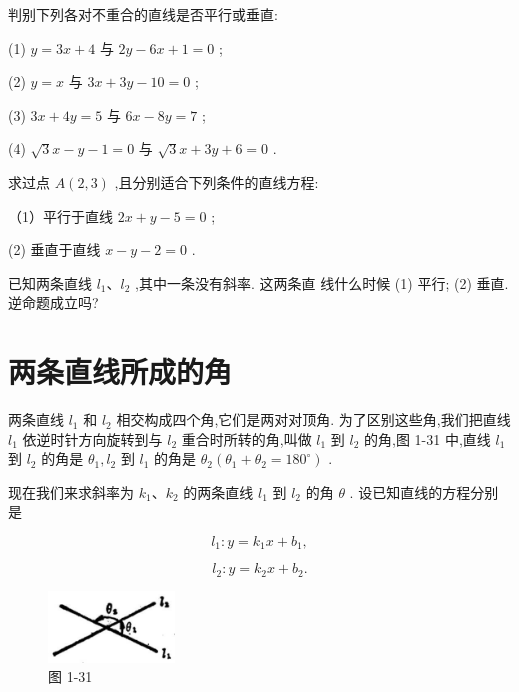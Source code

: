\documentclass[lang=cn,newtx,10pt,scheme=chinese]{elegantbook}
\begin{document}
\begin{problemset}[练习]

\item 判别下列各对不重合的直线是否平行或垂直:

(1) \(y = {3x} + 4\) 与 \({2y} - {6x} + 1 = 0\) ;

(2) \(y = x\) 与 \({3x} + {3y} - {10} = 0\) ;

(3) \({3x} + {4y} = 5\) 与 \({6x} - {8y} = 7\) ;

(4) \(\sqrt{3}x - y - 1 = 0\) 与 \(\sqrt{3}x + {3y} + 6 = 0\) .

\item 求过点 \(A\left( {2,3}\right)\) ,且分别适合下列条件的直线方程:

（1）平行于直线 \({2x} + y - 5 = 0\) ;

(2) 垂直于直线 \(x - y - 2 = 0\) .

\item 已知两条直线 \({l}_{1}\text{、}{l}_{2}\) ,其中一条没有斜率. 这两条直 线什么时候 (1) 平行; (2) 垂直. 逆命题成立吗?
\end{problemset}

\section{两条直线所成的角}

两条直线 \({l}_{1}\) 和 \({l}_{2}\) 相交构成四个角,它们是两对对顶角. 为了区别这些角,我们把直线 \({l}_{1}\) 依逆时针方向旋转到与 \({l}_{2}\) 重合时所转的角,叫做 \({l}_{1}\) 到 \({l}_{2}\) 的角,图 1-31 中,直线 \({l}_{1}\) 到 \({l}_{2}\) 的角是 \({\theta }_{1},{l}_{2}\) 到 \({l}_{1}\) 的角是 \({\theta }_{2}\left( {{\theta }_{1} + {\theta }_{2} = {180}^{ \circ }}\right)\) .

现在我们来求斜率为 \({k}_{1}\text{、}{k}_{2}\) 的两条直线 \({l}_{1}\) 到 \({l}_{2}\) 的角 \(\theta\) . 设已知直线的方程分别是

\[
    {l}_{1} : y = {k}_{1}x + {b}_{1},
\]

\[
    {l}_{2} : y = {k}_{2}x + {b}_{2}.
\]

\begin{figure}[h]
  \centering
  \includegraphics[max width=0.3\textwidth]{images/01912cc2-ffb6-728e-9ae7-b113ff05c64b_46_107087.jpg}
  \caption{图 1-31}
\end{figure}
\end{document}
